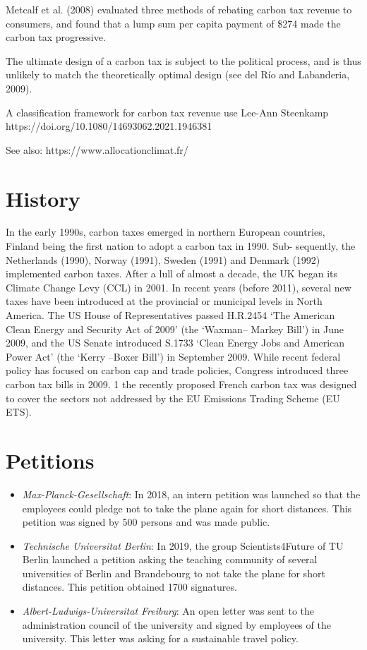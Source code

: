 \documentclass[version=3.21, pagesize, twoside=off, bibliography=totoc, DIV=calc, fontsize=12pt, a4paper, french, english]{scrartcl}
\begin{document}
Metcalf et al. (2008) evaluated three methods of rebating
carbon tax revenue to consumers, and found that a lump sum per capita payment of \$274 made the
carbon tax progressive.

The ultimate design of a carbon tax is subject to the political process, and is thus unlikely to match the theoretically optimal design (see del Río and Labanderia, 2009).

A classification framework for carbon tax revenue use
Lee-Ann Steenkamp
https://doi.org/10.1080/14693062.2021.1946381 

See also: https://www.allocationclimat.fr/

\section{History}
In the early 1990s, carbon taxes emerged
in northern European countries, Finland being the first nation to adopt a carbon tax in 1990. Sub-
sequently, the Netherlands (1990), Norway (1991), Sweden (1991) and Denmark (1992) implemented
carbon taxes. After a lull of almost a decade, the UK began its Climate Change Levy (CCL) in 2001. In
recent years (before 2011), several new taxes have been introduced at the provincial or municipal levels in North
America.
The US House of Representatives
passed H.R.2454 ‘The American Clean Energy and Security Act of 2009’ (the ‘Waxman– Markey Bill’) in
June 2009, and the US Senate introduced S.1733 ‘Clean Energy Jobs and American Power Act’ (the
‘Kerry –Boxer Bill’) in September 2009. While recent federal policy has focused on carbon cap and
trade policies, Congress introduced three carbon tax bills in 2009. 1
the recently proposed French carbon tax was
designed to cover the sectors not addressed by the EU Emissions Trading Scheme (EU ETS).

\section{Petitions} 
\begin{itemize}
\item \emph{Max-Planck-Gesellschaft}: In 2018, an intern petition was launched so that the employees could pledge not to take the plane again for short distances. This petition was signed by 500 persons and was made public. 
\item \emph{Technische Universitat Berlin}: In 2019, the group Scientists4Future of TU Berlin launched a petition asking the teaching community of several universities of Berlin and Brandebourg to not take the plane for short distances. This petition obtained 1700 signatures.
\item \emph{Albert-Ludwigs-Universitat Freiburg}: An open letter was sent to the administration council of the university and signed by employees of the university. This letter was asking for a sustainable travel policy. 
\end{itemize}
\end{document}
